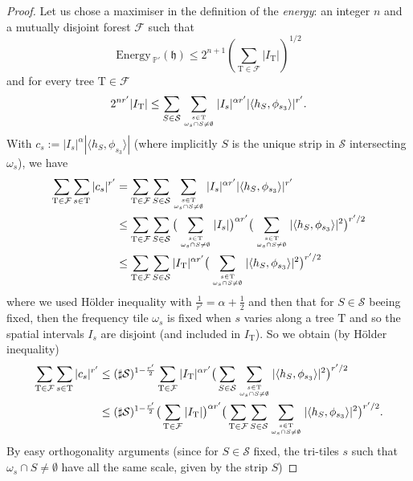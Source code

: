 \documentclass[10pt,a4paper]{amsart}
\newcommand{\FF}{\mathcal{F}}
\newcommand{\PP}{\mathbb{P}}
\newcommand{\TT}{\mathrm{T}}
\newcommand{\energy}{\mathrm{Energy \,}}
\newcommand{\hh}{\mathfrak{h}}
\begin{document}
\begin{proof}
Let us chose a maximiser in the definition of the {\it energy}: an integer $n$ and a mutually disjoint forest $\FF$ such that 
$$\energy_{\PP'}(\hh) \leq 2^{n+1}\left(\sum_{\TT \in \FF} |I_{\TT}| \right)^{1/2}$$
and for every tree $\TT\in\FF$
$$ 2^{n r'} |I_{\TT}| \leq \sum_{S\in{\mathcal S}} \sum_{s\in\TT \atop \omega_s \cap S \neq \emptyset} |I_s|^{\alpha r'} |\langle h_S,\phi_{s_3}\rangle|^{r'}.$$
With $c_s:=|I_s|^{\alpha} |\langle h_S, \phi_{s_3}\rangle |$ (where implicitly $S$ is the unique strip in ${\mathcal S}$ intersecting $\omega_{s}$), we have
\begin{align*}
\sum_{\TT\in \FF} \sum_{s\in \TT} |c_s|^{r'} & =
\sum_{\TT\in \FF} \sum_{S\in {\mathcal S}} \sum_{s\in \TT \atop \omega_s \cap S \neq\emptyset} |I_s|^{\alpha r'} |\langle h_S,\phi_{s_3}\rangle|^{r'} \\
& \leq
\sum_{\TT\in \FF} \sum_{S\in {\mathcal S}} \big(\sum_{s\in \TT \atop \omega_s \cap S \neq\emptyset} |I_s|\big)^{\alpha r'} \big(\sum_{s\in \TT \atop \omega_s \cap S \neq\emptyset} |\langle h_S,\phi_{s_3}\rangle|^{2}\big)^{r'/2} \\
& \leq
\sum_{\TT\in \FF} \sum_{S\in {\mathcal S}} |I_{\TT}|^{\alpha r'} \big(\sum_{s\in \TT \atop \omega_s \cap S \neq\emptyset} |\langle h_S,\phi_{s_3}\rangle|^{2}\big)^{r'/2} \\
\end{align*}
where we used H\"older inequality with $\frac{1}{r'}=\alpha+\frac{1}{2}$ and then that for $S\in{\mathcal S}$ beeing fixed, then the frequency tile $\omega_s$ is fixed when $s$ varies along a tree $\TT$ and so the spatial intervals $I_s$ are disjoint (and included in $I_{\TT}$).
So we obtain (by H\"older inequality)
\begin{align*}
\sum_{\TT\in \FF} \sum_{s\in \TT} |c_s|^{r'} & \leq (\sharp {\mathcal S})^{1-\frac{r'}{2}}
\sum_{\TT\in \FF} |I_{\TT}|^{\alpha r'} \big(\sum_{S\in {\mathcal S}} \sum_{s\in \TT \atop \omega_s \cap S \neq\emptyset} |\langle h_S,\phi_{s_3}\rangle|^{2}\big)^{r'/2} \\
& \leq (\sharp {\mathcal S})^{1-\frac{r'}{2}}
\big(\sum_{\TT\in \FF} |I_{\TT}|\big)^{\alpha r'} \big(\sum_{\TT\in \FF} \sum_{S\in {\mathcal S}} \sum_{s\in \TT \atop \omega_s \cap S \neq\emptyset} |\langle h_S,\phi_{s_3}\rangle|^{2}\big)^{r'/2}.
\end{align*}
By easy orthogonality arguments (since for $S\in{\mathcal S}$ fixed, the tri-tiles $s$ such that $\omega_s\cap S\neq \emptyset$ have all the same scale, given by the strip $S$)

\end{proof}
\end{document}
